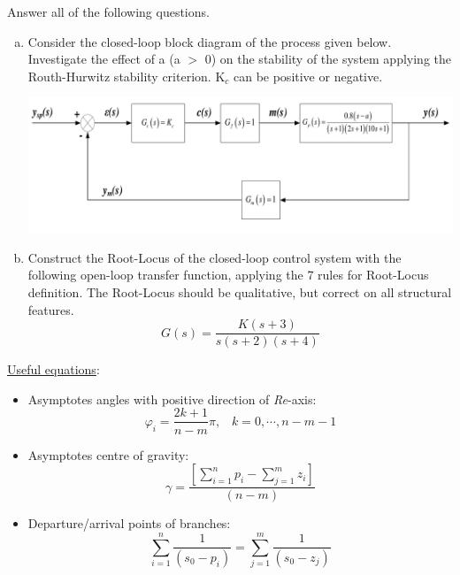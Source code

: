 \documentclass[calculator,datasheet]{exam}
\newcommand{\frc}{\displaystyle\frac}
\begin{document}
\begin{question}

Answer all of the following questions.

\begin{enumerate}[(a)]
%
\item Consider the closed-loop block diagram of the process given below. Investigate the effect of a (a $>$ 0) on the stability of the system applying the Routh-Hurwitz stability criterion. K$_{c}$ can be positive or negative.~
\begin{center}
\includegraphics[width=\columnwidth]{./Pics/EG5597_Control_1_May_2014-5.pdf}
\end{center} 
\item Construct the Root-Locus of the closed-loop control system with the following open-loop transfer function, applying the 7 rules for Root-Locus definition. The Root-Locus should be qualitative, but correct on all structural features.~
\begin{displaymath}
G(s) = \frc{K(s+3)}{s(s+2)(s+4)}  
\end{displaymath}
\end{enumerate}

\underline{Useful equations}:
\begin{itemize}
\item Asymptotes angles with positive direction of {\it Re}-axis: 
\begin{displaymath}
\varphi_{i} = \frc{2k + 1}{n -m}\pi,\;\;\;k=0,\cdots,n-m-1
\end{displaymath}

\item Asymptotes centre of gravity:
\begin{displaymath}
\gamma=\frc{\left[\sum\limits_{i=1}^{n}p_{i}-\sum\limits_{j=1}^{m}z_{i}\right]}{(n-m)}
\end{displaymath}

\item Departure/arrival points of branches: 
\begin{displaymath}
\sum\limits_{i=1}^{n}\frc{1}{\left(s_{0}-p_{i}\right)}=\sum\limits_{j=1}^{m}\frc{1}{\left(s_{0}-z_{j}\right)}
\end{displaymath} 

\end{itemize}

\end{question}
\end{document}
